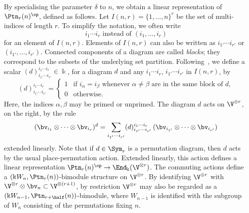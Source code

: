 By specialising the parameter $\delta$ to $n$, we obtain a linear
representation of $\Ptn_r(n)^{\op}$, defined as follows. Let $I(n,r) =
\{1, \dots, n\}^r$ be the set of multi-indices of length $r$. To
simplify the notation, we often write
\[
 \text{$i_1 \cdots i_r$ instead of $(i_1, \dots, i_r)$}
\]
for an element of $I(n,r)$. Elements of $I(n,r)$ can also be written
as $i_{1'} \cdots i_{r'}$ or $(i_{1'}, \dots, i_{r'})$. Connected
components of a diagram are called \emph{blocks}; they correspond to
the subsets of the underlying set partition. Following~\cite{HR-2005},
we define a scalar $(d)^{i_1 \cdots i_r}_{i_{1'} \cdots i_{r'}} \in
\Bbbk$, for a diagram $d$ and any $i_1 \cdots i_r$, $i_{1'} \cdots
i_{r'}$ in $I(n,r)$, by
\[
(d)^{i_1 \cdots i_r}_{i_{1'} \cdots i_{r'}} = 
\begin{cases}
 1 & \text{if } i_\alpha = i_\beta \text{ whenever } \alpha \ne
 \beta \text{ are in the same block of } d,\\ 
 0 & \text{otherwise}.
\end{cases}
\]
Here, the indices $\alpha,\beta$ may be primed or unprimed. The
diagram $d$ acts on $\V^{\otimes r}$, on the right, by the rule
\begin{equation}\label{eq:Ptn-action}
(\bv_{i_1} \otimes \cdots \otimes \bv_{i_r})^d = \sum_{i_{1'} \cdots
 i_{r'}} (d)^{i_1 \cdots i_r}_{i_{1'} \cdots i_{r'}} \, (\bv_{i_{1'}}
 \otimes \cdots \otimes \bv_{i_{r'}})
\end{equation}
extended linearly. Note that if $d \in \Sym_r$ is a permutation
diagram, then $d$ acts by the usual place-permutation action. Extended
linearly, this action defines a linear representation $\Ptn_r(n)^{\op}
\to \End_\Bbbk(\V^{\otimes r})$. The commuting actions define a
$(\Bbbk W_n, \Ptn_r(n))$-bimodule structure on $\V^{\otimes r}$. By
identifying $\V^{\otimes r}$ with $\V^{\otimes r} \otimes \bv_n
\subset \V^{\otimes (r+1)}$, by restriction $\V^{\otimes r}$ may also
be regarded as a $(\Bbbk W_{n-1}, \Ptn_{r+\half}(n))$-bimodule, where
$W_{n-1}$ is identified with the subgroup of $W_n$ consisting of the
permutations fixing $n$.

